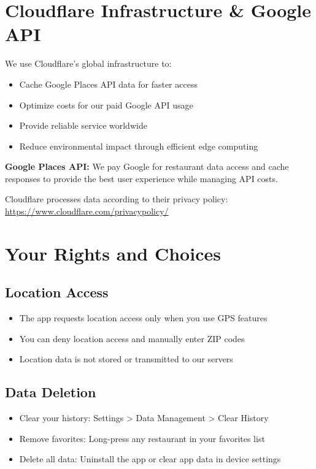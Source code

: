 \documentclass[11pt,letterpaper]{article}
\begin{document}
\section{Cloudflare Infrastructure \& Google API}
We use Cloudflare's global infrastructure to:
\begin{itemize}
    \item Cache Google Places API data for faster access
    \item Optimize costs for our paid Google API usage
    \item Provide reliable service worldwide
    \item Reduce environmental impact through efficient edge computing
\end{itemize}

\textbf{Google Places API:} We pay Google for restaurant data access and cache responses to provide the best user experience while managing API costs.

Cloudflare processes data according to their privacy policy: \url{https://www.cloudflare.com/privacypolicy/}

\section{Your Rights and Choices}

\subsection{Location Access}
\begin{itemize}
    \item The app requests location access only when you use GPS features
    \item You can deny location access and manually enter ZIP codes
    \item Location data is not stored or transmitted to our servers
\end{itemize}

\subsection{Data Deletion}
\begin{itemize}
    \item Clear your history: Settings > Data Management > Clear History
    \item Remove favorites: Long-press any restaurant in your favorites list
    \item Delete all data: Uninstall the app or clear app data in device settings
\end{itemize}
\end{document}
